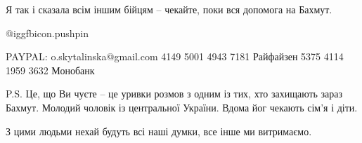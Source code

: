Я так і сказала всім іншим бійцям -- чекайте, поки вся допомога на Бахмут.

@igg{fbicon.pushpin} 

\obeycr
PAYPAL: o.skytalinska@gmail.com
4149 5001 4943 7181 Райфайзен
5375 4114 1959 3632 Монобанк
\restorecr

P.S. Це, що Ви чуєте -- це уривки розмов з одним із тих, хто захищають зараз
Бахмут. Молодий чоловік із центральної України. Вдома йог чекають сім'я і діти.

З цими людьми нехай будуть всі наші думки, все інше ми витримаємо.

